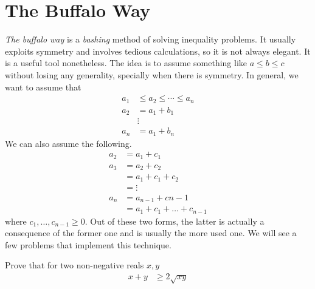 \documentclass{subfile}
\begin{document}
	\chapter{The Buffalo Way}\label{ch:buffalo}%
	\textit{The buffalo way} is a \textit{bashing} method of solving inequality problems. It usually exploits symmetry and involves tedious calculations, so it is not always elegant. It is a useful tool nonetheless. The idea is to assume something like $a\leq b\leq c$ without losing any generality, specially when there is symmetry. In general, we want to assume that
		\begin{align*}
			a_1
				& \leq a_2\leq\cdots\leq a_n\\
			a_2
				& = a_1+b_1\\
				& \vdots\\
			a_n
				& = a_1+b_n
		\end{align*}
	We can also assume the following.
		\begin{align*}
			a_2
				& = a_1+c_1\\
			a_3
				& = a_2+c_2\\
				& = a_1+c_1+c_2\\
				& = \vdots\\
			a_n
				& = a_{n-1}+c{n-1}\\
				& = a_1+c_1+\ldots+c_{n-1}
		\end{align*}
	where $c_1,\ldots,c_{n-1}\geq0$. Out of these two forms, the latter is actually a consequence of the former one and is usually the more used one. We will see a few problems that implement this technique.
		\begin{problem}
			Prove that for two non-negative reals $x,y$
				\begin{align*}
					x+y
						& \geq2\sqrt{xy}
				\end{align*}
		\end{problem}
	
\end{document}
